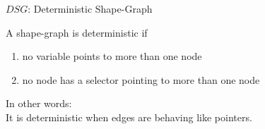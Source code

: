 \documentclass[xcolor={usenames,dvipsnames}]{beamer}
\renewcommand{\emph}[1]{\alert{#1}}
\newcommand\defeq{\stackrel{\mathclap{\tiny\mbox{def}}}{=}}
\begin{document}
\begin{frame}[fragile]{$DSG$: Deterministic Shape-Graph}
%

  A shape-graph is \emph{deterministic} if
  \begin{enumerate}
  \item no variable points to more than one node%
  \item no node has a selector pointing to more than one node%
  \end{enumerate}

  \vspace{1em}  
  In other words:\\
  \hspace{1.5em} It is deterministic when edges are behaving like \emph{pointers}.
\end{frame}
\end{document}
